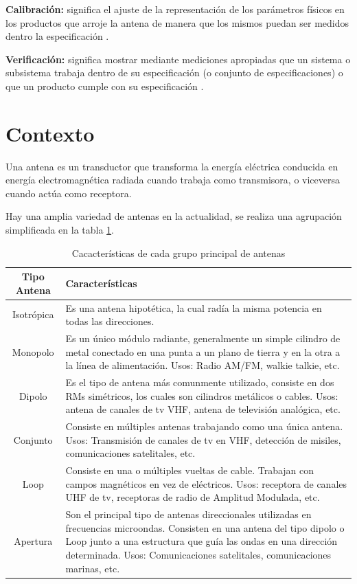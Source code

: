 {\textbf{Calibración:}} significa el ajuste de la representación de los parámetros físicos en los productos que arroje la
antena de manera que los mismos puedan ser medidos dentro la especificación \cite{Mittermayer2007}.

{\textbf{Verificación:}} significa mostrar mediante mediciones apropiadas que un sistema o subsistema trabaja dentro de su
especificación (o conjunto de especificaciones) o que un producto cumple con su especificación \cite{Mittermayer2007}.

\section{Contexto} \label{sc:context}

Una antena es un transductor que transforma la energía eléctrica conducida en energía electromagnética radiada cuando
trabaja como transmisora, o viceversa cuando actúa como receptora.

Hay una amplia variedad de antenas en la actualidad, se realiza una agrupación simplificada en la tabla \ref{tab:type_antennas}.

\begin{table}[H]
  \footnotesize
  \centering
  \begin{tabular}{|c|p{9cm}|}
	\hline
	\textbf{Tipo Antena} & \textbf{Características} \\\hline
	Isotrópica & Es una antena hipotética, la cual radía la misma potencia en todas las direcciones.\\\hline
	Monopolo & Es un único módulo radiante, generalmente un simple cilindro de metal conectado en una punta a un plano de
	tierra y en la otra a la línea de alimentación. Usos: Radio AM/FM, walkie talkie, etc. \\\hline
	Dipolo & Es el tipo de antena más comunmente utilizado, consiste en dos RMs simétricos, los cuales son cilindros
	metálicos o cables. Usos: antena de canales de tv VHF, antena de televisión analógica, etc. \\\hline
	Conjunto & Consiste en múltiples antenas trabajando como una única antena. Usos: Transmisión de canales de tv en VHF,
	detección de misiles, comunicaciones satelitales, etc.\\\hline
	Loop & Consiste en una o múltiples vueltas de cable. Trabajan con campos magnéticos en vez de eléctricos. Usos: receptora
	de canales UHF de tv, receptoras de radio de Amplitud Modulada, etc.\\\hline
	Apertura & Son el principal tipo de antenas direccionales utilizadas en frecuencias microondas. Consisten en una antena
	del tipo dipolo o Loop junto a una estructura que guía las ondas en una dirección determinada. Usos: Comunicaciones
	satelitales, comunicaciones marinas, etc.\\\hline
  \end{tabular}
  \caption{Cacacterísticas de cada grupo principal de antenas}
  \label{tab:type_antennas}
\end{table}

